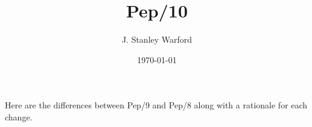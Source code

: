 \documentclass[10pt,fleqn]{book}
\begin{document}
\frontmatter

	\title{\Huge Pep/10}
	\author{J. Stanley Warford}
	\date{\today}
	\maketitle


\mainmatter
	\pagestyle{fancy}
	\fancyhf{}
	\renewcommand{\headrulewidth}{1pt}
	\renewcommand{\footrulewidth}{0pt}
	\renewcommand{\chaptermark}[1]{\markboth{\sffamily\chaptername{} \thechapter\quad \large\rmfamily\slshape#1}{}}
	\renewcommand{\sectionmark}[1]{\markright{#1}}
	\renewcommand{\headrule}{{\color{blue} \hrule width\headwidth height\headrulewidth \vskip-\headrulewidth}}	

\setcounter{page}{1}
\noindent Here are the differences between Pep/9 and Pep/8 along with a rationale for each change.
\end{document}
